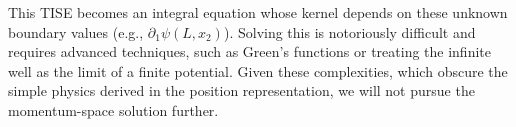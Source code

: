 This TISE becomes an integral equation whose kernel depends on these
unknown boundary values (e.g., $\partial_{1}\psi(L, x_2)$).
Solving this is notoriously difficult and requires advanced techniques,
such as Green's functions or treating the infinite well as the
limit of a finite potential. Given these complexities, which
obscure the simple physics derived in the position representation,
we will not pursue the momentum-space solution further.
